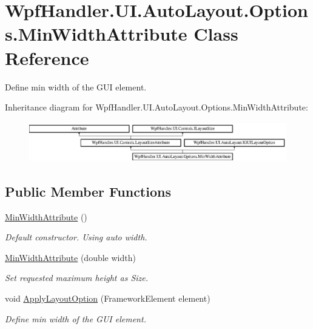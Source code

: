 \hypertarget{class_wpf_handler_1_1_u_i_1_1_auto_layout_1_1_options_1_1_min_width_attribute}{}\section{Wpf\+Handler.\+U\+I.\+Auto\+Layout.\+Options.\+Min\+Width\+Attribute Class Reference}
\label{class_wpf_handler_1_1_u_i_1_1_auto_layout_1_1_options_1_1_min_width_attribute}


Define min width of the G\+UI element.  


Inheritance diagram for Wpf\+Handler.\+U\+I.\+Auto\+Layout.\+Options.\+Min\+Width\+Attribute\+:\begin{figure}[H]
\begin{center}
\leavevmode
\includegraphics[height=1.750000cm]{d2/d96/class_wpf_handler_1_1_u_i_1_1_auto_layout_1_1_options_1_1_min_width_attribute}
\end{center}
\end{figure}
\subsection*{Public Member Functions}
\begin{DoxyCompactItemize}
\item 
\mbox{\hyperlink{class_wpf_handler_1_1_u_i_1_1_auto_layout_1_1_options_1_1_min_width_attribute_a9b1911633fbe6a02f618cc6a8011013f}{Min\+Width\+Attribute}} ()
\begin{DoxyCompactList}\small\item\em Default constructor. Using auto width. \end{DoxyCompactList}\item 
\mbox{\hyperlink{class_wpf_handler_1_1_u_i_1_1_auto_layout_1_1_options_1_1_min_width_attribute_a073c7f0b94a87b68e71267c6a18c3ba3}{Min\+Width\+Attribute}} (double width)
\begin{DoxyCompactList}\small\item\em Set requested maximum height as Size. \end{DoxyCompactList}\item 
void \mbox{\hyperlink{class_wpf_handler_1_1_u_i_1_1_auto_layout_1_1_options_1_1_min_width_attribute_a22bf72913c8d5d9f958d1edb1b52beda}{Apply\+Layout\+Option}} (Framework\+Element element)
\begin{DoxyCompactList}\small\item\em Define min width of the G\+UI element. \end{DoxyCompactList}\end{DoxyCompactItemize}
